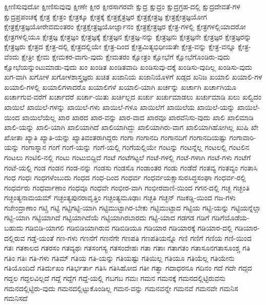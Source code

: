 {ಕ್ಷೀಣಿಸುವುದೋ
ಕ್ಷೀಣಿಸುವುವು
ಕ್ಷೀಣೇ
ಕ್ಷೀರ
ಕ್ಷೀರಸಾಗರವೇ
ಕ್ಷುದ್ರ
ಕ್ಷುದ್ರಂ
ಕ್ಷುದ್ರಗ್ರಹ-ದಲ್ಲಿ
ಕ್ಷುದ್ರದೇವತೆ-ಗಳ
ಕ್ಷುದ್ರಪ್ರಪಂಚಕ್ಕೆ
ಕ್ಷೇತ್ರ
ಕ್ಷೇತ್ರಂ
ಕ್ಷೇತ್ರಕ್ಕೂ
ಕ್ಷೇತ್ರಕ್ಕೆ
ಕ್ಷೇತ್ರಕ್ಷೆತ್ರಜ್ಞರ
ಕ್ಷೇತ್ರಕ್ಷೇತ್ರಜ್ಞ
ಕ್ಷೇತ್ರಕ್ಷೇತ್ರಜ್ಞಯೋಗ
ಕ್ಷೇತ್ರಕ್ಷೇತ್ರಜ್ಞಯೋರೇವಮಂತರಂ
ಕ್ಷೇತ್ರಕ್ಷೇತ್ರಜ್ಞಯೋರ್ಜ್ಞಾನಂ
ಕ್ಷೇತ್ರಕ್ಷೇತ್ರಜ್ಞರ
ಕ್ಷೇತ್ರ-ಗಳಲ್ಲಿ
ಕ್ಷೇತ್ರಗಳಲ್ಲಿಯಾದರೋ
ಕ್ಷೇತ್ರಗಳಲ್ಲಿಯೂ
ಕ್ಷೇತ್ರಜ್ಞ
ಕ್ಷೇತ್ರಜ್ಞಂ
ಕ್ಷೇತ್ರಜ್ಞಕ್ಕೆ
ಕ್ಷೇತ್ರಜ್ಞನ
ಕ್ಷೇತ್ರಜ್ಞ-ನನ್ನು
ಕ್ಷೇತ್ರಜ್ಞನು
ಕ್ಷೇತ್ರಜ್ಞನೇ
ಕ್ಷೇತ್ರಜ್ಞರ
ಕ್ಷೇತ್ರಜ್ಞರನ್ನು
ಕ್ಷೇತ್ರಜ್ಞರು
ಕ್ಷೇತ್ರದ
ಕ್ಷೇತ್ರ-ದಲ್ಲಿ
ಕ್ಷೇತ್ರದಲ್ಲಿಯೇ
ಕ್ಷೇತ್ರ-ದಿಂದ
ಕ್ಷೇತ್ರಮಿತ್ಯಭಿಧೀಯತೇ
ಕ್ಷೇತ್ರ-ವನ್ನು
ಕ್ಷೇತ್ರ-ವನ್ನೂ
ಕ್ಷೇತ್ರ-ವೆಂದು
ಕ್ಷೇತ್ರೀ
ಕ್ಷೇಮ
ಕ್ಷೇಮಕರ-ವಾಗು-ವುದು
ಕ್ಷೇಮತರಂ
ಕ್ಷೋತ್ರಂ
ಕ್ಷೋಭೆಗೆ
ಕ್ಷೋಭೆಗೊಂಡಿರು-ವುದು
ಕ್ಷೋಭೆಯನ್ನುಂಟುಮಾಡು-ವುದು
ಖಂ
ಖಂಡಿತ
ಖಂಡಿತವಾದಿ
ಖಂಡಿಸುವು-ದಕ್ಕೆ
ಖಂಡಿಸು-ವುದಿಲ್ಲ
ಖಂಡಿಸು-ವುದು
ಖಗ-ವಾಗಿ
ಖಗೋಳ
ಖಗೋಳಶಾಸ್ತ್ರಜ್ಞರು
ಖಚಿತ
ಖಜಾನಿಯ
ಖಜಾನಿಯೊಳಗೆ
ಖಡ್ಗದ
ಖನಿಜ
ಖಯಾಲಿ
ಖಯಾಲಿ-ಗಳ
ಖಯಾಲಿ-ಗಳಲ್ಲಿ
ಖಯಾಲಿಗಳಾದರೊ
ಖಯಾಲಿಗಳೆ
ಖಯಾಲಿ-ಯಾಗಿ
ಖರ್ಚನ್ನು
ಖರ್ಚಾಗಿ
ಖರ್ಚಾಗಿಯೂ
ಖರ್ಚಾಗುವ-ವರೆಗೆ
ಖರ್ಚಾದರೆ
ಖರ್ಚಾ-ಯಿತು
ಖರ್ಚಿಲ್ಲದ
ಖರ್ಚು
ಖರ್ಚುಮಾಡಲು
ಖರ್ಚುಮಾಡಿ
ಖಲು
ಖಲ್ವಿದಂ
ಖಾಯಿಲೆ
ಖಾಯಿಲೆ-ಗಳನ್ನು
ಖಾಯಿಲೆ-ಗಳು
ಖಾಯಿಲೆ-ಗಳೂ
ಖಾಯಿಲೆಗೆ
ಖಾಯಿಲೆಯ
ಖಾಯಿಲೆ-ಯನ್ನು
ಖಾಯಿಲೆ-ಯಿಂದ
ಖಾಯಿಲೆಯೆಲ್ಲ
ಖಾರ
ಖಾರದ
ಖಾರ-ವನ್ನು
ಖಾರ-ವಾದ
ಖಾರವೂ
ಖಾರವೆನಿಸು-ವುದು
ಖಾಲಿ
ಖಾಲಿಮಾಡಿ
ಖಾಲಿ-ಯನ್ನು
ಖಾಲಿ-ಯಾಗಿ
ಖಾಲಿಯಾಗಿದೆ
ಖಾಲಿಯಾಗಿದ್ದು
ಖಾಲಿಯಾಗಿರು-ವಾಗ
ಖಾಲಿಯಾಗಿಹೋಗಿಲ್ಲ
ಖುಷಿ
ಖೇ
ಖೋತಾ
ಖ್ಯಾತಿ
ಖ್ಯಾತಿ-ಯನ್ನು
ಖ್ಯಾತಿವಂತರಾಗಿದ್ದರು
ಗಂಗಾ
ಗಂಗಾನದಿ
ಗಂಗಾನದಿಗೆ
ಗಂಗಾನದಿಯಷ್ಟು
ಗಂಗಾವಾರಿ-ಯನ್ನು
ಗಂಗಾಸ್ನಾನ
ಗಂಗೆ
ಗಂಗೆ-ಯನ್ನು
ಗಂಗೆ-ಯಲ್ಲಿ
ಗಂಗೆಯಲ್ಲಿಯೇ
ಗಂಟನ್ನು
ಗಂಟನ್ನೆಲ್ಲ
ಗಂಟಲಲ್ಲಿ
ಗಂಟಲಿನ
ಗಂಟಲು
ಗಂಟಿಲಿ-ನಲ್ಲಿ
ಗಂಟು
ಗಂಟುಬಿದ್ದಿದೆ
ಗಂಟೆ
ಗಂಟೆಗಟ್ಟಲೆ
ಗಂಟೆ-ಗಳಲ್ಲಿ
ಗಂಟೆ-ಗಳಾಗಿ
ಗಂಟೆ-ಗಳು
ಗಂಟೆಗೆ
ಗಂಟೆ-ಯಲ್ಲಿ
ಗಂಡ
ಗಂಡನ
ಗಂಡ-ನನ್ನು
ಗಂಡಸು
ಗಂಡಸೊ
ಗಂಡಾಂತರ
ಗಂಡು
ಗಂಡೆದೆ
ಗಂತವ್ಯ
ಗಂತವ್ಯಂ
ಗಂತಾಸಿ
ಗಂಧ
ಗಂಧಃ
ಗಂಧಗಳೆಂಬುದು
ಗಂಧದ
ಗಂಧ-ದಿಂದ
ಗಂಧರ್ವ
ಗಂಧರ್ವಯಕ್ಷಾಸುರಸಿದ್ಧಸಂಘಾ
ಗಂಧರ್ವ-ರಲ್ಲಿ
ಗಂಧರ್ವರು
ಗಂಧರ್ವಾಣಾಂ
ಗಂಧವೂ
ಗಂಧವೇ
ಗಂಭೀರ-ವಾಗಿ
ಗಂಭೀರವಾಣಿ-ಯಿಂದ
ಗಗನ-ದಲ್ಲಿ
ಗಚ್ಛ
ಗಚ್ಛಂತಿ
ಗಚ್ಛಂತ್ಯನಾಮಯಮ್
ಗಚ್ಛಂತ್ಯಪುನರಾವೃತ್ತಿಂ
ಗಚ್ಛಂತ್ಯಮೂಢಾಃ
ಗಚ್ಛತಿ
ಗಚ್ಛನ್
ಗಜಕಡ್ಡಿ-ಯಿಂದ
ಗಜ-ಗಳು
ಗಜೇಂದ್ರಾಣಾಂ
ಗಟ್ಚಿ
ಗಟ್ಟಿ
ಗಟ್ಟಿಗಟ್ಟಿ-ಯಾಗಿ
ಗಟ್ಟಿಮುಟ್ಟಾಗಿರ-ಬೇಕು
ಗಟ್ಟಿಮುಟ್ಟಾದ
ಗಟ್ಟಿಯ
ಗಟ್ಟಿ-ಯನ್ನು
ಗಟ್ಟಿಯನ್ನೆಲ್ಲಾ
ಗಟ್ಟಿ-ಯಾಗಿ
ಗಟ್ಟಿಯಾಗಿದೆ
ಗಟ್ಟಿಯಾಗಿದೆಯೆ
ಗಟ್ಟಿಯಾಗಿರಬಾರದು
ಗಟ್ಟಿ-ಯಾದ
ಗಡಗಡ
ಗಡಿಗೆ
ಗಡಿಗೆಯೊಡೆಯ-ಬಹುದು
ಗಡಿಬಿಡಿ-ಯಾಗಲಿ
ಗಡಿಬಿಡಿಯಾಗಿರುವ
ಗಡಿಬಿಡಿಯೂ
ಗಡಿಯಾರ
ಗಡಿಯಾರಕ್ಕೆ
ಗಡಿಯಾರ-ದಲ್ಲಿ
ಗಡಿಯಾರ-ದಲ್ಲಿರುವ
ಗಡ್ಡೆ-ಯಂತೆ
ಗಣ-ಗಳು
ಗಣನೆಗೆ
ಗಣನೆಗೇ
ಗಣಪತಿ
ಗಣಪತಿಯನ್ನೊ
ಗಣಿ
ಗಣಿಗೆ
ಗಣಿಯ
ಗಣಿ-ಯಿಂದ
ಗತಃ
ಗತಕಾಲದ
ಗತರಸಂ
ಗತವ್ಯಥಃ
ಗತಸಂಗಸ್ಯ
ಗತಸಂದೇಹಃ
ಗತಾ
ಗತಾಃ
ಗತಾಗತಂ
ಗತಾಸೂನಗತಾಸೂಂಶ್ಚ
ಗತಿ
ಗತಿಂ
ಗತಿಃ
ಗತಿ-ಗಳು
ಗತಿಮ್
ಗತಿಯ
ಗತಿ-ಯನ್ನು
ಗತಿಯಷ್ಟು
ಗತಿಯಿಲ್ಲ
ಗತಿಯೂ
ಗತಿಯೆಲ್ಲ
ಗತಿಯೇನು
ಗತಿಯೊಂದಿದೆ
ಗತಿರ್ದುಖಂ
ಗತಿರ್ಭರ್ತಾ
ಗತಿಸಿ
ಗತಿಸಿಹೋದ
ಗತೀ
ಗತ್ವಾ
ಗದಾಧರನೂ
ಗದಿನಂ
ಗದೆ
ಗದೇ
ಗದ್ಗದ
ಗದ್ದಲ
ಗದ್ದಲವಿಲ್ಲದೆ
ಗದ್ದೆ
ಗದ್ದೆಗ
ಗದ್ದೆ-ಯಲ್ಲಿ
ಗಬಗಬ
ಗಮಃ
ಗಮನ
ಗಮನಕ್ಕೆ
ಗಮನದಲ್ಲಿಟ್ಟಿರುವನು
ಗಮನದಲ್ಲಿಟ್ಟಿರು-ವುದು
ಗಮನದಲ್ಲಿಟ್ಟುಕೊಂಡಿಲ್ಲ
ಗಮನ-ವನ್ನು
ಗಮನವನ್ನೇ
ಗಮನವೆ
ಗಮನವೇ
ಗಮನಿಸ
ಗಮನಿಸದೆ
}
